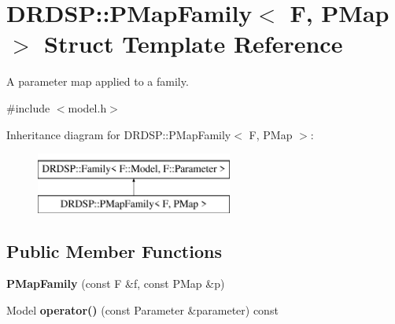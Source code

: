 \hypertarget{struct_d_r_d_s_p_1_1_p_map_family}{\section{D\-R\-D\-S\-P\-:\-:P\-Map\-Family$<$ F, P\-Map $>$ Struct Template Reference}
\label{struct_d_r_d_s_p_1_1_p_map_family}
}


A parameter map applied to a family.  




{\ttfamily \#include $<$model.\-h$>$}

Inheritance diagram for D\-R\-D\-S\-P\-:\-:P\-Map\-Family$<$ F, P\-Map $>$\-:\begin{figure}[H]
\begin{center}
\leavevmode
\includegraphics[height=2.000000cm]{struct_d_r_d_s_p_1_1_p_map_family}
\end{center}
\end{figure}
\subsection*{Public Member Functions}
\begin{DoxyCompactItemize}
\item 
\hypertarget{struct_d_r_d_s_p_1_1_p_map_family_a75d942e4c38daaa1b399ececdbb3fb86}{{\bfseries P\-Map\-Family} (const F \&f, const P\-Map \&p)}\label{struct_d_r_d_s_p_1_1_p_map_family_a75d942e4c38daaa1b399ececdbb3fb86}

\item 
\hypertarget{struct_d_r_d_s_p_1_1_p_map_family_a4f852cebd93cf4f45f7a49862846f1bb}{Model {\bfseries operator()} (const Parameter \&parameter) const }\label{struct_d_r_d_s_p_1_1_p_map_family_a4f852cebd93cf4f45f7a49862846f1bb}

\end{DoxyCompactItemize}
